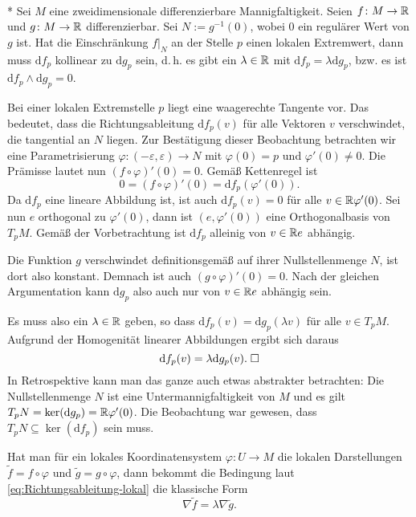 \begin{theorem}\mbox{}\\*
Sei $M$ eine zweidimensionale differenzierbare Mannigfaltigkeit.
Seien $f\colon M\to\mathbb R$ und $g\colon M\to\mathbb R$
differenzierbar. Sei $N:=g^{-1}(0)$, wobei 0 ein regulärer Wert 
von $g$ ist. Hat die Einschränkung $f|_N$ an der Stelle $p$ einen
lokalen Extremwert, dann muss $\mathrm df_p$ kollinear zu
$\mathrm dg_p$ sein, d.\,h. es gibt ein $\lambda\in\mathbb R$ mit
$\mathrm df_p = \lambda\mathrm dg_p$, bzw. es ist
$\mathrm df_p\land\mathrm dg_p=0$.
\end{theorem}
\noindent{}
Bei einer lokalen Extremstelle $p$ liegt eine waagerechte Tangente vor.
Das bedeutet, dass die Richtungsableitung $\mathrm df_p(v)$ für alle
Vektoren $v$ verschwindet, die tangential an $N$ liegen. Zur
Bestätigung dieser Beobachtung betrachten wir eine Parametrisierung
$\varphi\colon (-\varepsilon,\varepsilon) \to N$ mit
$\varphi(0)=p$ und $\varphi'(0)\ne 0$. Die Prämisse lautet nun
$(f\circ\varphi)'(0)=0$. Gemäß Kettenregel ist
\begin{equation}
0 = (f\circ\varphi)'(0) =  \mathrm df_p(\varphi'(0)).
\end{equation}
Da $\mathrm df_p$ eine lineare Abbildung ist, ist
auch $\mathrm df_p(v)=0$ für alle $v\in\mathbb R\varphi'(0)$.
Sei nun $e$ orthogonal zu $\varphi'(0)$, dann ist
$(e,\varphi'(0))$ eine Orthogonalbasis von $T_p M$. Gemäß der
Vorbetrachtung ist $\mathrm df_p$ alleinig von $v\in\mathbb R e$ abhängig.

Die Funktion $g$ verschwindet definitionsgemäß auf ihrer
Nullstellenmenge $N$, ist dort also konstant. Demnach
ist auch $(g\circ\varphi)'(0)=0$. Nach der gleichen Argumentation
kann $\mathrm dg_p$ also auch nur von $v\in\mathbb R e$ abhängig sein.

Es muss also ein $\lambda\in\mathbb R$ geben, so dass
$\mathrm df_p(v) = \mathrm dg_p(\lambda v)$ für alle $v\in T_p M$.
Aufgrund der Homogenität linearer Abbildungen ergibt sich daraus
\begin{equation}
\mathrm df_p(v) = \lambda\mathrm dg_p(v).\;\Box
\end{equation}
In Retrospektive kann man das ganze auch etwas abstrakter
betrachten: Die Nullstellenmenge $N$ ist eine Untermannigfaltigkeit von
$M$ und es gilt $T_p N=\operatorname{ker}(\mathrm dg_p)=\mathbb R\varphi'(0)$.
Die Beobachtung war gewesen, dass
$T_p N\subseteq \operatorname{ker}(\mathrm df_p)$
sein muss.

Hat man für ein lokales Koordinatensystem $\varphi\colon U\to M$ die
lokalen Darstellungen $\tilde f = f\circ\varphi$ und
$\tilde g = g\circ\varphi$, dann bekommt die Bedingung laut
\eqref{eq:Richtungsableitung-lokal} die klassische Form
\begin{equation}
\nabla\tilde f = \lambda\nabla\tilde g.
\end{equation}
